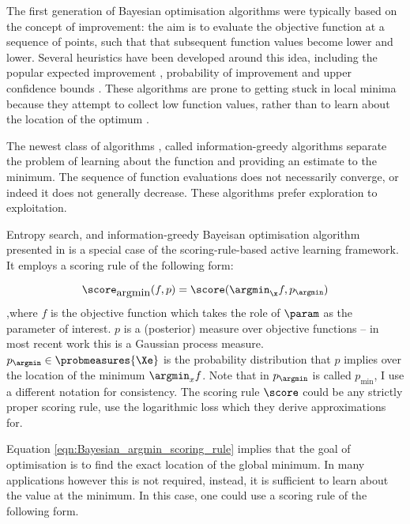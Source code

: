 The first generation of Bayesian optimisation algorithms were typically based on the concept of improvement: the aim is to evaluate the objective function at a sequence of points, such that that subsequent function values become lower and lower. Several heuristics have been developed around this idea, including the popular expected improvement \citep{Mockus1982,Jones1998, Frean2008}, probability of improvement \citep{Jones2001,Lizotte2008} and upper confidence bounds \citep{Srinivas2009}. These algorithms are prone to getting stuck in local minima because they attempt to collect low function values, rather than to learn about the location of the optimum \citep{Hennig2012entropy}.

The newest class of algorithms \citep{Hennig2012entropy}, called information-greedy algorithms separate the problem of learning about the function and providing an estimate to the minimum. The sequence of function evaluations does not necessarily converge, or indeed it does not generally decrease. These algorithms prefer exploration to exploitation.

Entropy search, and information-greedy Bayeisan optimisation algorithm presented in \citep{Hennig2012entropy} is a special case of the scoring-rule-based active learning framework. It employs a scoring rule of the following form:

\begin{equation}
	\score_{\mbox{argmin}}(f,p) = \score(\argmin_{\x}f,p_{\argmin}) \label{eqn:Bayesian_argmin_scoring_rule}
\end{equation}
,where $f$ is the objective function which takes the role of $\param$ as the parameter of interest. $p$ is a (posterior) measure over objective functions -- in most recent work this is a Gaussian process measure. $p_{\argmin} \in \probmeasures{\Xe}$ is the probability distribution that $p$ implies over the location of the minimum $\argmin_{x}f$. Note that in \citep{Hennig2012entropy} $p_{\argmin}$ is called $p_{\min}$, I use a different notation for consistency. The scoring rule $\score$ could be any strictly proper scoring rule, \citeauthor{Hennig2012entropy} use the logarithmic loss which they derive approximations for.

Equation \eqref{eqn:Bayesian_argmin_scoring_rule} implies that the goal of optimisation is to find the exact location of the global minimum. In many applications however this is not required, instead, it is sufficient to learn about the value at the minimum. In this case, one could use a scoring rule of the following form.

